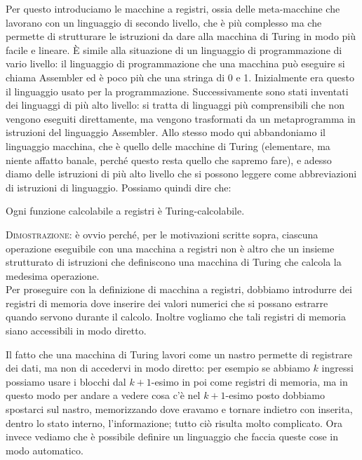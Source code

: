 Per questo introduciamo le macchine a registri, ossia delle
meta-macchine che lavorano con un linguaggio di secondo livello, che
\`e pi\`u complesso ma che permette di strutturare le istruzioni da
dare alla macchina di Turing in modo pi\`u facile e lineare. \`E
simile alla situazione di un linguaggio di programmazione di vario
livello: il linguaggio di programmazione che una macchina pu\`o
eseguire si chiama Assembler ed \`e poco pi\`u che una stringa di 0 e
1. Inizialmente era questo il linguaggio usato per la
programmazione. Successivamente sono stati inventati dei linguaggi di
pi\`u alto livello: si tratta di linguaggi pi\`u comprensibili che non
vengono eseguiti direttamente, ma vengono trasformati da un
metaprogramma in istruzioni del linguaggio Assembler.  Allo stesso
modo qui abbandoniamo il linguaggio macchina, che \`e quello delle
macchine di Turing (elementare, ma niente affatto banale, perch\'e
questo resta quello che sapremo fare), e adesso diamo delle istruzioni
di pi\`u alto livello che si possono leggere come abbreviazioni di
istruzioni di linguaggio. Possiamo quindi dire che:
\begin{teorema}
Ogni funzione calcolabile a registri \`e Turing-cal\-co\-la\-bi\-le.
\end{teorema}
\textsc{Dimostrazione}: \`e ovvio perch\'e, per le motivazioni scritte
sopra, ciascuna operazione eseguibile con una macchina a registri non
\`e altro che un insieme strutturato di istruzioni che definiscono una
macchina di Turing che calcola la medesima operazione.\\

Per proseguire con la definizione di macchina a registri, dobbiamo
introdurre dei registri di memoria dove inserire dei valori numerici
che si possano estrarre quando servono durante il calcolo. Inoltre
vogliamo che tali registri di memoria siano accessibili in modo
diretto.

Il fatto che una macchina di Turing lavori come un nastro permette di
registrare dei dati, ma non di accedervi in modo diretto: per esempio
se abbiamo \( k \) ingressi possiamo usare i blocchi dal \( k + 1
\)-esimo in poi come registri di memoria, ma in questo modo per andare
a vedere cosa c'\`e nel \( k + 1 \)-esimo posto dobbiamo spostarci sul
nastro, memorizzando dove eravamo e tornare indietro con inserita,
dentro lo stato interno, l'informazione; tutto ci\`o risulta molto
complicato.  Ora invece vediamo che \`e possibile definire un
linguaggio che faccia queste cose in modo automatico.

